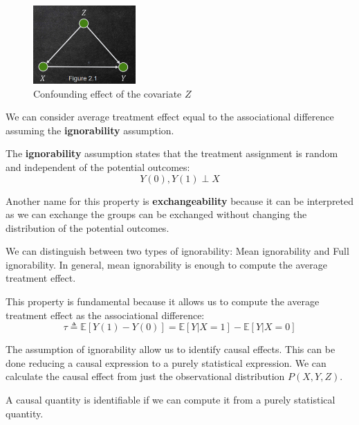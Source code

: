 \begin{figure}[!ht]
    \centering
    \includegraphics[width=0.35\textwidth]{img/confounding.png}
    \caption{Confounding effect of the covariate $Z$}
    \label{fig:confounding}
\end{figure}

We can consider average treatment effect equal to the associational difference
assuming the \textbf{ignorability} assumption.
\begin{definition}[Ignorability]
    The \textbf{ignorability} assumption states that the treatment assignment
    is random and independent of the potential outcomes:
    \begin{equation}
        Y(0), Y(1) \perp X
    \end{equation}
\end{definition}

Another name for this property is \textbf{exchangeability} because it can be
interpreted as we can exchange the groups can be exchanged without changing the
distribution of the potential outcomes.

We can distinguish between two types of ignorability: Mean ignorability and Full
ignorability. In general, mean ignorability is enough to compute the average
treatment effect.

This property is fundamental because it allows us to compute the average treatment
effect as the associational difference:
\begin{equation*}
    \tau \triangleq \mathbb{E}[Y(1) - Y(0)] = \mathbb{E}[Y|X = 1] - \mathbb{E}[Y|X = 0]
\end{equation*}

The assumption of ignorability allow us to identify causal effects. This can be
done reducing a causal expression to a purely statistical expression. We can
calculate the causal effect from just the observational distribution $P(X, Y, Z)$.

\begin{definition}[Identifiability]
    A causal quantity is identifiable if we can compute it from a purely statistical
    quantity.
\end{definition}

